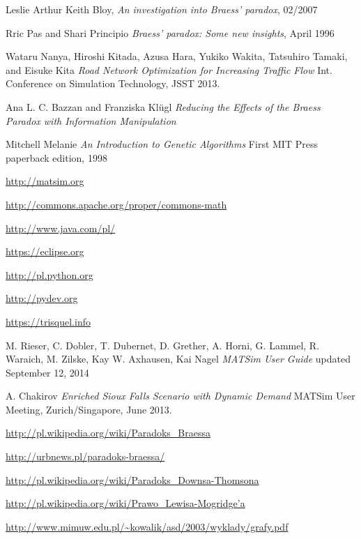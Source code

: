 \documentclass[twoside,12pt]{report}
\renewcommand{\bibname}{Bibliografia}
\begin{document}
\cleardoublepage
{}
\addcontentsline{toc}{chapter}{\bibname} 
\begin{thebibliography}{99}
	Leslie Arthur Keith Bloy, 
	\newblock \textit{An investigation into Braess’ paradox}, 02/2007

	Rric Pas and Shari Principio
	\newblock \textit{Braess’ paradox: Some new insights}, April 1996

	Wataru Nanya, Hiroshi Kitada, Azusa Hara, Yukiko Wakita, Tatsuhiro Tamaki, and Eisuke Kita
	\newblock \textit{Road Network Optimization for Increasing Traffic Flow}
	\newblock Int. Conference on Simulation Technology, JSST 2013.

	Ana L. C. Bazzan and Franziska Klügl
	\newblock \textit{Reducing the Effects of the Braess Paradox with Information Manipulation}

	Mitchell Melanie
	\newblock \textit{An Introduction to Genetic Algorithms}
	\newblock First MIT Press paperback edition, 1998

	\url{http://matsim.org}	

	\url{http://commons.apache.org/proper/commons-math}

	\url{http://www.java.com/pl/}

	\url{https://eclipse.org}
				
	\url{http://pl.python.org}
	
	\url{http://pydev.org}
	
	\url{https://trisquel.info}
			
	M. Rieser, C. Dobler, T. Dubernet, D. Grether, A. Horni, G. Lammel, R. Waraich, M. Zilske, Kay W. Axhausen, Kai Nagel
	\newblock \textit{MATSim User Guide}
	\newblock updated September 12, 2014

	A. Chakirov
	\newblock \textit{Enriched Sioux Falls Scenario with Dynamic Demand}
	\newblock MATSim User Meeting, Zurich/Singapore, June 2013.
	
	\url{http://pl.wikipedia.org/wiki/Paradoks_Braessa}
	
	\url{http://urbnews.pl/paradoks-braessa/}
	
	\url{http://pl.wikipedia.org/wiki/Paradoks_Downsa-Thomsona}
	
	\href{http://pl.wikipedia.org/wiki/Prawo_Lewisa-Mogridge\%E2\%80\%99a}
	    {http://pl.wikipedia.org/wiki/Prawo\_Lewisa-Mogridge\textquoteright{}a}
	   
	\url{http://www.mimuw.edu.pl/~kowalik/asd/2003/wyklady/grafy.pdf}

\end{thebibliography}
\end{document}
